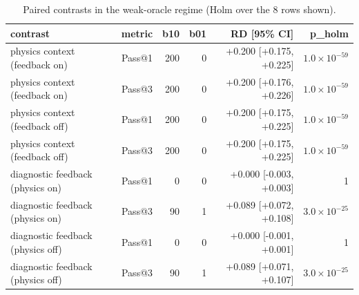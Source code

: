 \begin{table}[t]
\centering
\caption{Paired contrasts in the weak-oracle regime (Holm over the 8 rows shown).}
\label{tab:weakc}
\footnotesize
\setlength{\tabcolsep}{3pt}
\begin{tabular}{lrrrrr}
\toprule
contrast & metric & b10 & b01 & RD [95\% CI] & p\_holm \\
\midrule
physics context (feedback on) & Pass@1 & 200 & 0 & +0.200 [+0.175, +0.225] & $1.0\times 10^{-59}$ \\
physics context (feedback on) & Pass@3 & 200 & 0 & +0.200 [+0.176, +0.226] & $1.0\times 10^{-59}$ \\
physics context (feedback off) & Pass@1 & 200 & 0 & +0.200 [+0.175, +0.225] & $1.0\times 10^{-59}$ \\
physics context (feedback off) & Pass@3 & 200 & 0 & +0.200 [+0.175, +0.225] & $1.0\times 10^{-59}$ \\
diagnostic feedback (physics on) & Pass@1 & 0 & 0 & +0.000 [-0.003, +0.003] & 1 \\
diagnostic feedback (physics on) & Pass@3 & 90 & 1 & +0.089 [+0.072, +0.108] & $3.0\times 10^{-25}$ \\
diagnostic feedback (physics off) & Pass@1 & 0 & 0 & +0.000 [-0.001, +0.001] & 1 \\
diagnostic feedback (physics off) & Pass@3 & 90 & 1 & +0.089 [+0.071, +0.107] & $3.0\times 10^{-25}$ \\
\bottomrule
\end{tabular}
\end{table}
